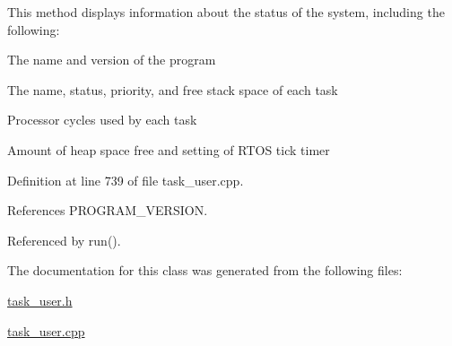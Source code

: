 This method displays information about the status of the system, including the following\-: \begin{DoxyItemize}
\item The name and version of the program \item The name, status, priority, and free stack space of each task \item Processor cycles used by each task \item Amount of heap space free and setting of R\-T\-O\-S tick timer \end{DoxyItemize}


Definition at line 739 of file task\-\_\-user.\-cpp.



References P\-R\-O\-G\-R\-A\-M\-\_\-\-V\-E\-R\-S\-I\-O\-N.



Referenced by run().



The documentation for this class was generated from the following files\-:\begin{DoxyCompactItemize}
\item 
\hyperlink{task__user_8h}{task\-\_\-user.\-h}\item 
\hyperlink{task__user_8cpp}{task\-\_\-user.\-cpp}\end{DoxyCompactItemize}
